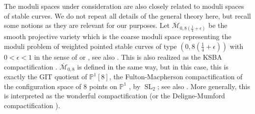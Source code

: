 \documentclass[12pt, pdftex]{amsart}
\theoremstyle{plain}
\theoremstyle{definition}
\numberwithin{equation}{section}
\def\P{{\mathbb P}}
\def\SL{\mathop{\mathrm{SL}}\nolimits}
\def\M{\mathcal{M}}
\begin{document}
The moduli spaces under consideration are also closely related to moduli spaces of stable curves. We do not repeat all details of the general theory here, but 
recall some notions as they are relevant for our purposes.
Let $\overline{\M}_{0,8(\frac{1}{4}+\epsilon)}$ be the smooth projective  variety which is the coarse moduli space representing the moduli problem of weighted pointed stable curves of type $(0,8(\frac{1}{4}+\epsilon))$ with $0<\epsilon<1$ in the sense of \cite[Theorem 2.1]{Ha03} or \cite[Definition 2.1, Theorem 2.2]{KM11}, see also \cite[Lemma 2.3, Remark 2.4, Remark 2.11, Example 2.12]{GKS21}.
This is also realized as the KSBA compactification \cite[Subsection 3.2]{GKS21}.
$\overline{\M}_{0,8}$ is defined in the same way, but in this case, this is exactly the GIT quotient of $\P^1[8]$, the Fulton-Macpherson compactification of the configuration space of 8 points on $\P^1$ \cite{FM94}, by $\SL_2$; see also \cite[p55]{MM07}.
More generally, this is interpreted as the wonderful compactification \cite[p536, Subsection 4.2]{Li09} (or the Deligne-Mumford compactification \cite[Remark 2.9]{GKS21}).
\end{document}

